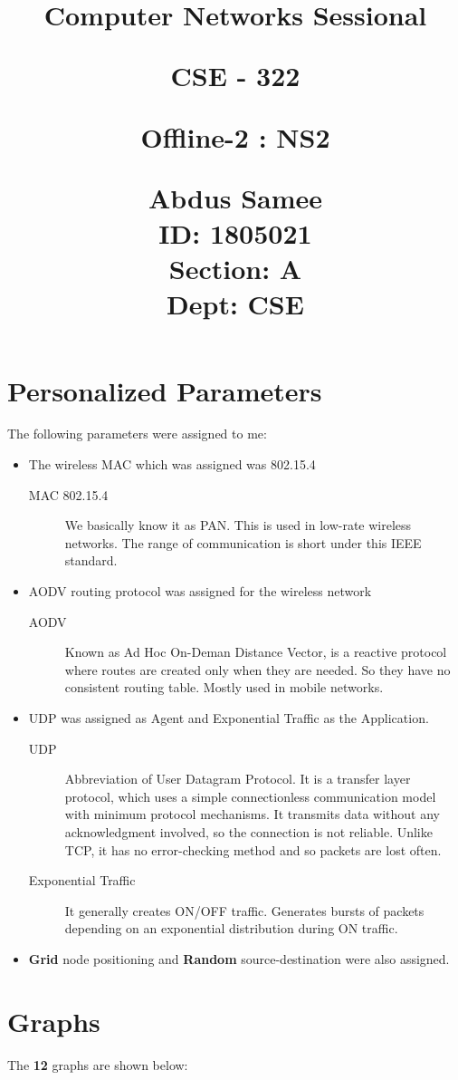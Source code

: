 \documentclass{article}
\title{%
  \begin{center}
        \vspace*{1cm}
            
        \Huge
        \textbf{Computer Networks Sessional}
            
        \vspace{0.5cm}
        \LARGE
        CSE - 322
            
        \vspace{1.5cm}
            
        \textbf{Offline-2 : NS2}
                        
        \vspace{0.8cm}
                        
        \Large
        Abdus Samee\\
        ID: 1805021\\
        Section: A\\
        Dept: CSE\\
    \end{center}
  }
\date{}
\begin{document}
\maketitle
\newpage

\section{Personalized Parameters}
The following parameters were assigned to me:

\begin{itemize}
     \item The wireless MAC which was assigned was 802.15.4
     \begin{description}
         \item[MAC 802.15.4] We basically know it as PAN. This is used in low-rate wireless networks. The range of communication is short under this IEEE standard.
     \end{description}
     \item AODV routing protocol was assigned for the wireless network
     \begin{description}
         \item[AODV] Known as Ad Hoc On-Deman Distance Vector, is a reactive protocol where routes are created only when they are needed. So they have no consistent routing table. Mostly used in mobile networks.
     \end{description}
     \item UDP was assigned as Agent and Exponential Traffic as the Application.
     \begin{description}
         \item[UDP] Abbreviation of User Datagram Protocol. It is a transfer layer protocol, which uses a simple connectionless communication model with minimum protocol mechanisms. It transmits data without any acknowledgment involved, so the connection is not reliable. Unlike TCP, it has no error-checking method and so packets are lost often.
         \item[Exponential Traffic] It generally creates ON/OFF traffic. Generates bursts of packets depending on an exponential distribution during ON traffic. 
     \end{description}
     \item \textbf{Grid} node positioning and \textbf{Random} source-destination were also assigned.
\end{itemize}

\section{Graphs}
The \textbf{12} graphs are shown below:
\end{document}

